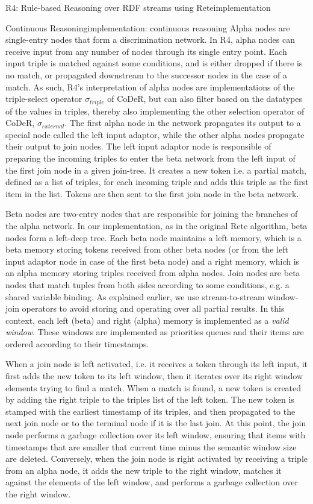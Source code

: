 \begin{nestedsection}{R4: Rule-based Reasoning over RDF streams using Rete}{implementation}
\begin{nestedsection}{Continuous Reasoning}{implementation: continuous reasoning}
		Alpha nodes are single-entry nodes that form a discrimination network.
		In R4, alpha nodes can receive input from any number of nodes through its single entry point.
		Each input triple is matched against some conditions, and is either dropped if there is no match, or propagated downstream to the successor nodes in the case of a match.
		As such, R4's interpretation of alpha nodes are implementations of the triple-select operator $\sigma_{triple}$ of CoDeR, but can also filter based on the datatypes of the values in triples, thereby also implementing the other selection operator of CoDeR, $\sigma_{external}$.
		The first alpha node in the network propagates its output to a special node called the left input adaptor, while the other alpha nodes propagate their output to join nodes.
		The left input adaptor node is responsible of preparing the incoming triples to enter the beta network from the left input of the first join node in a given join-tree.
		It creates a new token i.e. a partial match, defined as a list of triples, for each incoming triple and adds this triple as the first item in the list.
		Tokens are then sent to the first join node in the beta network.

		Beta nodes are two-entry nodes that are responsible for joining the branches of the alpha network.
		In our implementation, as in the original Rete algorithm, beta nodes form a left-deep tree.
		Each beta node maintains a left memory, which is a beta memory storing tokens received from other beta nodes (or from the left input adaptor node in case of the first beta node) and a right memory, which is an alpha memory storing triples received from alpha nodes.
		Join nodes are beta nodes that match tuples from both sides according to some conditions, e.g. a shared variable binding.
		As explained earlier, we use stream-to-stream window-join operators to avoid storing and operating over all partial results.
		In this context, each left (beta) and right (alpha) memory is implemented as a \emph{valid window}.
		These windows are implemented as priorities queues and their items are ordered according to their timestamps.

		When a join node is left activated, i.e. it receives a token through its left input, it first adds the new token to its left window, then it iterates over its right window elements trying to find a match.
		When a match is found, a new token is created by adding the right triple to the triples list of the left token.
		The new token is stamped with the earliest timestamp of its triples, and then propagated to the next join node or to the terminal node if it is the last join.
		At this point, the join node performs a garbage collection over its left window, ensuring that items with timestamps that are smaller that current time minus the semantic window size are deleted.
		Conversely, when the join node is right activated by receiving a triple from an alpha node, it adds the new triple to the right window, matches it against the elements of the left window, and performs a garbage collection over the right window.


\end{nestedsection}
\end{nestedsection}
